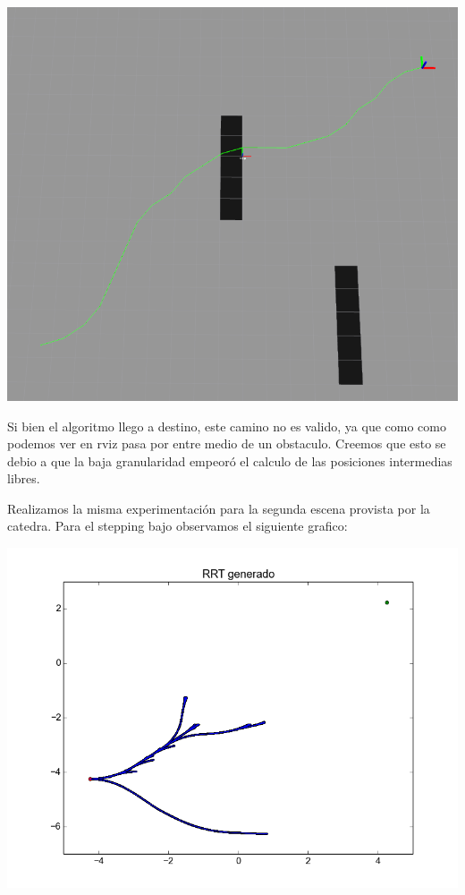 \includegraphics[scale=0.3]{velocidad/stepping_alto_rviz1.png}

Si bien el algoritmo llego a destino, este camino no es valido, ya que como como podemos ver en rviz pasa por entre medio de un obstaculo. Creemos que esto se debio a que la baja granularidad empeoró el calculo de las posiciones intermedias libres.

Realizamos la misma experimentación para la segunda escena provista por la catedra. Para el stepping bajo observamos el siguiente grafico:

\includegraphics[scale=0.5]{velocidad/stepping_bajo2.png}

